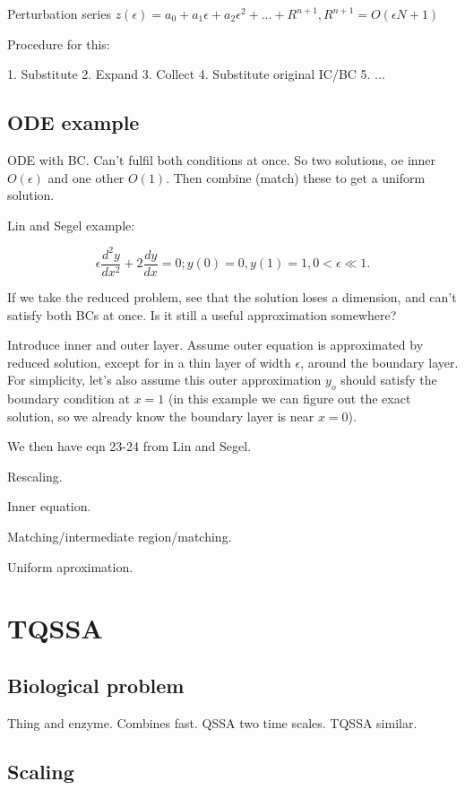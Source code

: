 \documentclass[12pt]{report}
\begin{document}
Perturbation series $z(\epsilon) = a_0 + a_1 \epsilon + a_2 \epsilon^2 + ... +
R^{n+1}, R^{n+1} = O(\epsilon{N+1})$

Procedure for this:

1. Substitute
2. Expand
3. Collect
4. Substitute original IC/BC
5. ...

\section{ODE example}

ODE with BC. Can't fulfil both conditions at once. So two solutions, oe inner
$O(\epsilon)$ and one other $O(1)$. Then combine (match) these to get a uniform
solution.

Lin and Segel example:

$$\epsilon \frac{d^2 y}{d x^2} + 2 \frac{dy}{dx} = 0; y(0)=0, y(1)=1, 0 <
\epsilon \ll 1.$$

If we take the reduced problem, see that the solution loses a dimension, and
can't satisfy both BCs at once. Is it still a useful approximation somewhere?

Introduce inner and outer layer. Assume outer equation is approximated by
reduced solution, except for in a thin layer of width $\epsilon$, around the
boundary layer. For simplicity, let's also assume this outer approximation
$y_o$ should satisfy the boundary condition at $x=1$ (in this example we can
figure out the exact solution, so we already know the boundary layer is near
$x=0$).

We then have eqn 23-24 from Lin and Segel.

Rescaling.

Inner equation.

Matching/intermediate region/matching.

Uniform aproximation.

\chapter{TQSSA}

\section{Biological problem}

Thing and enzyme. Combines fast. QSSA two time scales. TQSSA similar.

\section{Scaling}
\end{document}
